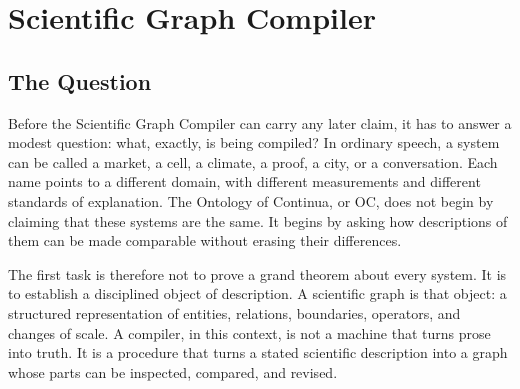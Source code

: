 \documentclass[11pt,a4paper,openany]{book}
\begin{document}
\section{Scientific Graph Compiler}
\subsection{The Question}
Before the Scientific Graph Compiler can carry any later claim, it has to answer a modest question: what, exactly, is being compiled? In ordinary speech, a system can be called a market, a cell, a climate, a proof, a city, or a conversation. Each name points to a different domain, with different measurements and different standards of explanation. The Ontology of Continua, or OC, does not begin by claiming that these systems are the same. It begins by asking how descriptions of them can be made comparable without erasing their differences. \cite{grimmett_percolation,goldenfeld_lectures}\par
The first task is therefore not to prove a grand theorem about every system. It is to establish a disciplined object of description. A scientific graph is that object: a structured representation of entities, relations, boundaries, operators, and changes of scale. A compiler, in this context, is not a machine that turns prose into truth. It is a procedure that turns a stated scientific description into a graph whose parts can be inspected, compared, and revised.\par
\end{document}
